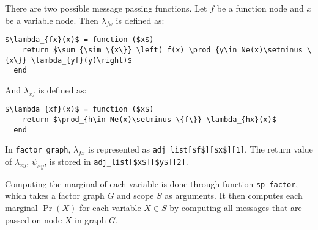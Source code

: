 \documentclass{amsart}
\theoremstyle{plain}
\newcommand{\code}[1]{\lstinline[mathescape=true]{#1}}
\newcommand{\mcode}[1]{\lstinline[mathescape]!#1!}
\begin{document}
There are two possible message passing functions. Let $f$ be a function node and $x$ be a variable
node. Then $\lambda_{fx}$ is defined as:

\begin{lstlisting}[mathescape=true]
  $\lambda_{fx}(x)$ = function ($x$)
    return $\sum_{\sim \{x\}} \left( f(x) \prod_{y\in Ne(x)\setminus \{x\}} \lambda_{yf}(y)\right)$
  end
\end{lstlisting}

And $\lambda_{xf}$ is defined as:

\begin{lstlisting}[mathescape=true]
  $\lambda_{xf}(x)$ = function ($x$)
    return $\prod_{h\in Ne(x)\setminus \{f\}} \lambda_{hx}(x)$
  end
\end{lstlisting}

In \code{factor_graph}, $\lambda_{fx}$ is represented as \mcode{adj_list[$f$][$x$][1]}. The return
value of $\lambda_{xy}$, $\psi_{xy}$, is stored in \mcode{adj_list[$x$][$y$][2]}.

Computing the marginal of each variable is done through function \code{sp_factor}, which takes a
factor graph $G$ and scope $S$ as arguments. It then computes each marginal $\Pr(X)$ for each
variable $X\in S$ by computing all messages that are passed on node $X$ in graph $G$.

\newpage

\printbibliography[]
\end{document}
